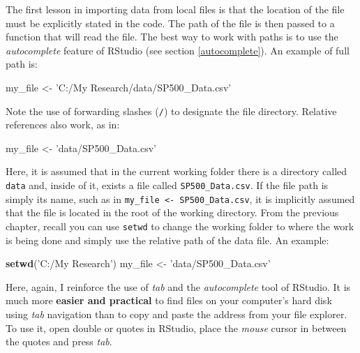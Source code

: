 \documentclass[
  12pt,
]{book}
\newenvironment{Shaded}{\begin{snugshade}}{\end{snugshade}}
\newcommand{\KeywordTok}[1]{\textcolor[rgb]{0.27,0.27,0.27}{\textbf{#1}}}
\newcommand{\NormalTok}[1]{#1}
\newcommand{\StringTok}[1]{\textcolor[rgb]{0.5,0.5,0.5}{#1}}
\newenvironment{rmdimportant}
{\begin{importantblock}
		
	} {\end{importantblock}}
\begin{document}
The first lesson in importing data from local files is that the location of the file must be explicitly stated in the code. The path of the file is then passed to a function that will read the file. The best way to work with paths is to use the \emph{autocomplete} feature of RStudio (see section \ref{autocomplete}). An example of full path is:

\begin{Shaded}
\begin{Highlighting}[]
\NormalTok{my_file <-}\StringTok{ 'C:/My Research/data/SP500_Data.csv'}
\end{Highlighting}
\end{Shaded}

Note the use of forwarding slashes (\texttt{/}) to designate the file directory. Relative references also work, as in:

\begin{Shaded}
\begin{Highlighting}[]
\NormalTok{my_file <-}\StringTok{ 'data/SP500_Data.csv'}
\end{Highlighting}
\end{Shaded}

Here, it is assumed that in the current working folder there is a directory called \texttt{data} and, inside of it, exists a file called \texttt{SP500\_Data.csv}. If the file path is simply its name, such as in \texttt{my\_file\ \textless{}-\ \textquotesingle{}SP500\_Data.csv\textquotesingle{}}, it is implicitly assumed that the file is located in the root of the working directory. From the previous chapter, recall you can use \texttt{setwd} to change the working folder to where the work is being done and simply use the relative path of the data file. An example:

\begin{Shaded}
\begin{Highlighting}[]
\KeywordTok{setwd}\NormalTok{(}\StringTok{'C:/My Research'}\NormalTok{)}
\NormalTok{my_file <-}\StringTok{ 'data/SP500_Data.csv'}
\end{Highlighting}
\end{Shaded}

\begin{rmdimportant}
Here, again, I reinforce the use of \emph{tab} and the
\emph{autocomplete} tool of RStudio. It is much more \textbf{easier and
practical} to find files on your computer's hard disk using \emph{tab}
navigation than to copy and paste the address from your file explorer.
To use it, open double or quotes in RStudio, place the \emph{mouse}
cursor in between the quotes and press \emph{tab}.
\end{rmdimportant}
\end{document}
